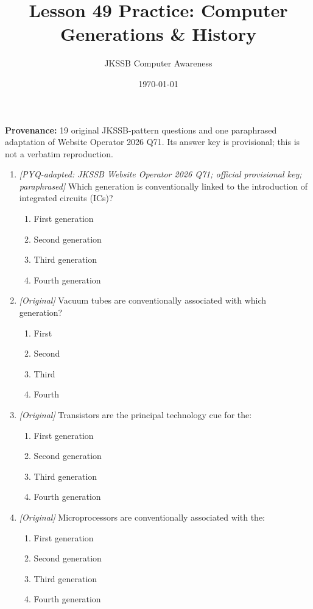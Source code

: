 \documentclass[11pt]{article}
\title{Lesson 49 Practice: Computer Generations \& History}
\author{JKSSB Computer Awareness}
\date{\today}
\begin{document}
\maketitle
\noindent\textbf{Provenance:} 19 original JKSSB-pattern questions and one
paraphrased adaptation of Website Operator 2026 Q71. Its answer key is
provisional; this is not a verbatim reproduction.

\begin{enumerate}[label=\textbf{Q\arabic*.}, leftmargin=*]
\item \textit{[PYQ-adapted: JKSSB Website Operator 2026 Q71; official
provisional key; paraphrased]} Which generation is conventionally linked to
the introduction of integrated circuits (ICs)?
  \begin{enumerate}[label=\Alph*.]
    \item First generation
    \item Second generation
    \item Third generation
    \item Fourth generation
  \end{enumerate}
\item \textit{[Original]} Vacuum tubes are conventionally associated with
  which generation?
  \begin{enumerate}[label=\Alph*.]
    \item First
    \item Second
    \item Third
    \item Fourth
  \end{enumerate}
\item \textit{[Original]} Transistors are the principal technology cue for
  the:
  \begin{enumerate}[label=\Alph*.]
    \item First generation
    \item Second generation
    \item Third generation
    \item Fourth generation
  \end{enumerate}
\item \textit{[Original]} Microprocessors are conventionally associated
  with the:
  \begin{enumerate}[label=\Alph*.]
    \item First generation
    \item Second generation
    \item Third generation
    \item Fourth generation

\end{enumerate}
\end{enumerate}
\end{document}
